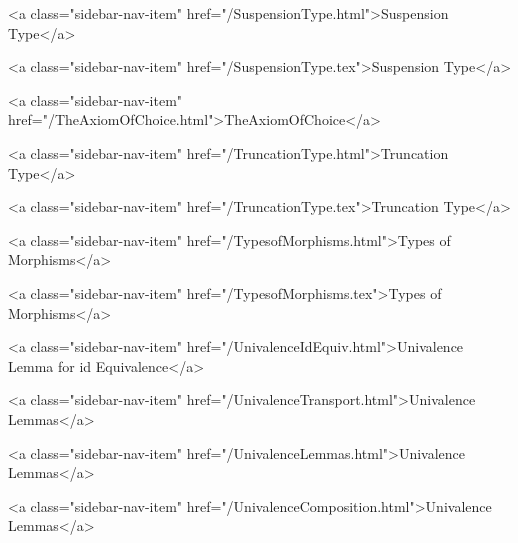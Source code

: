       
    
      
        
          <a class="sidebar-nav-item" href="/SuspensionType.html">Suspension Type</a>
        
      
    
      
        
          <a class="sidebar-nav-item" href="/SuspensionType.tex">Suspension Type</a>
        
      
    
      
        
          <a class="sidebar-nav-item" href="/TheAxiomOfChoice.html">TheAxiomOfChoice</a>
        
      
    
      
        
          <a class="sidebar-nav-item" href="/TruncationType.html">Truncation Type</a>
        
      
    
      
        
          <a class="sidebar-nav-item" href="/TruncationType.tex">Truncation Type</a>
        
      
    
      
        
          <a class="sidebar-nav-item" href="/TypesofMorphisms.html">Types of Morphisms</a>
        
      
    
      
        
          <a class="sidebar-nav-item" href="/TypesofMorphisms.tex">Types of Morphisms</a>
        
      
    
      
        
          <a class="sidebar-nav-item" href="/UnivalenceIdEquiv.html">Univalence Lemma for id Equivalence</a>
        
      
    
      
        
          <a class="sidebar-nav-item" href="/UnivalenceTransport.html">Univalence Lemmas</a>
        
      
    
      
        
          <a class="sidebar-nav-item" href="/UnivalenceLemmas.html">Univalence Lemmas</a>
        
      
    
      
        
          <a class="sidebar-nav-item" href="/UnivalenceComposition.html">Univalence Lemmas</a>
        

